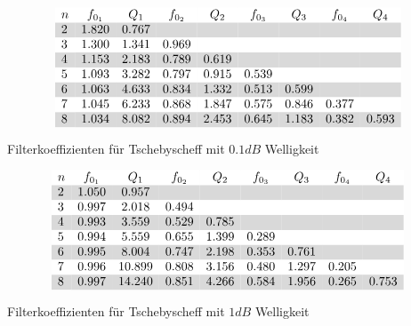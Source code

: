 \begin{table}[h!]
\[ \begin{array}{@{}lcccccccc}
\rowcolor{white} n & f_{0_1}& Q_1   & f_{0_2}   & Q_2   & f_{0_3}   & Q_3   & f_{0_4}   & Q_4   \\
\rowcolor{lgray} 2 & 1.820  & 0.767 &           &       &           &       &           &       \\
\rowcolor{white} 3 & 1.300  & 1.341 & 0.969     &       &           &       &           &       \\
\rowcolor{lgray} 4 & 1.153  & 2.183 & 0.789     & 0.619 &           &       &           &       \\
\rowcolor{white} 5 & 1.093  & 3.282 & 0.797     & 0.915 & 0.539     &       &           &       \\
\rowcolor{lgray} 6 & 1.063  & 4.633 & 0.834     & 1.332 & 0.513     & 0.599 &           &       \\
\rowcolor{white} 7 & 1.045  & 6.233 & 0.868     & 1.847 & 0.575     & 0.846 & 0.377     &       \\
\rowcolor{lgray} 8 & 1.034  & 8.082 & 0.894     & 2.453 & 0.645     & 1.183 & 0.382     & 0.593 \\
\end{array} \]
\caption{Filterkoeffizienten für Tschebyscheff mit $0.1 dB$ Welligkeit}
\label{tab:filt-coeff-butt}
\end{table}

\begin{table}[h!]
\[ \begin{array}{@{}lcccccccc}
\rowcolor{white} n & f_{0_1}& Q_1   & f_{0_2}   & Q_2   & f_{0_3}   & Q_3   & f_{0_4}   & Q_4   \\
\rowcolor{lgray} 2 & 1.050  & 0.957 &           &       &           &       &           &       \\
\rowcolor{white} 3 & 0.997  & 2.018 & 0.494     &       &           &       &           &       \\
\rowcolor{lgray} 4 & 0.993  & 3.559 & 0.529     & 0.785 &           &       &           &       \\
\rowcolor{white} 5 & 0.994  & 5.559 & 0.655     & 1.399 & 0.289     &       &           &       \\
\rowcolor{lgray} 6 & 0.995  & 8.004 & 0.747     & 2.198 & 0.353     & 0.761 &           &       \\
\rowcolor{white} 7 & 0.996  &10.899 & 0.808     & 3.156 & 0.480     & 1.297 & 0.205     &       \\
\rowcolor{lgray} 8 & 0.997  &14.240 & 0.851     & 4.266 & 0.584     & 1.956 & 0.265     & 0.753 \\
\end{array} \]
\caption{Filterkoeffizienten für Tschebyscheff mit $1 dB$ Welligkeit}
\label{tab:filt-coeff-butt}
\end{table}
